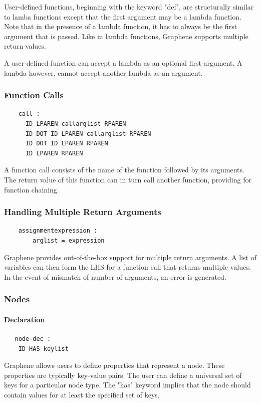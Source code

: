 \documentclass[a4paper]{article}
\begin{document}
\indent User-defined functions, beginning with the keyword "def", are structurally similar to lamba functions except that the first argument may be a lambda function. Note that in the presence of a lambda function, it has to always be the first argument that is passed. Like in lambda functions, Graphene supports multiple return values.

\indent A user-defined function can accept a lambda as an optional first argument. A lambda however, cannot accept another lambda as an argument.

\subsubsection{Function Calls}
\begin{verbatim}
    call :
      ID LPAREN callarglist RPAREN
      ID DOT ID LPAREN callarglist RPAREN
      ID DOT ID LPAREN RPAREN
      ID LPAREN RPAREN
\end{verbatim}

\indent A function call consists of the name of the function followed by its arguments. The return value of this function can in turn call another function, providing for function chaining.

\subsubsection{Handling Multiple Return Arguments}
\begin{verbatim}
    assignmentexpression :
  		arglist = expression
\end{verbatim}

\indent Graphene provides out-of-the-box support for multiple return arguments. A list of variables can then form the LHS for a function call that returns multiple values. In the event of mismatch of number of arguments, an error is generated.

\subsubsection{Nodes}
\paragraph{Declaration}
\begin{verbatim}
   node-dec :  
  	ID HAS keylist
\end{verbatim}

\indent Graphene allows users to define properties that represent a node. These properties are typically key-value pairs. The user can define a universal set of keys for a particular node type. The "has" keyword implies that the node should contain values for at least the specified set of keys.
\end{document}
